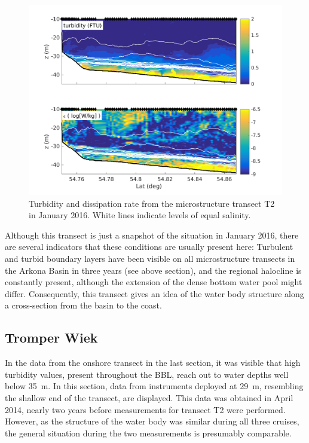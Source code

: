 \begin{figure}[ht]
\includegraphics[width=40pc]{bilder/abtrans.png}
 \caption{Turbidity and dissipation rate from the microstructure transect T2 
in January 2016. White lines indicate levels of equal salinity.}
 \label{transect}
 \end{figure}
 
 Although this transect is just a snapshot of the situation in January 
2016, there are several indicators that these conditions are usually present 
here: Turbulent and turbid boundary layers have been visible on all 
microstructure transects in the Arkona Basin in three years (see above 
section), 
and the regional halocline is constantly present, although the extension 
of the dense bottom water pool might differ. Consequently, this transect gives 
an idea of the water body structure along a cross-section from the basin to 
the coast.
  
\FloatBarrier
\subsection{Tromper Wiek}

In the data from the onshore transect in the last section, it was visible that 
high turbidity values, present throughout the BBL, reach out to water depths 
well below 35~m. In this section, data from instruments deployed at 29~m, 
resembling the shallow end of the transect, are displayed. This data was 
obtained in April 2014, nearly two years before measurements for transect T2 
were performed. However, as the structure of the water body was similar during 
all three cruises, the general situation during the two measurements is 
presumably comparable.


